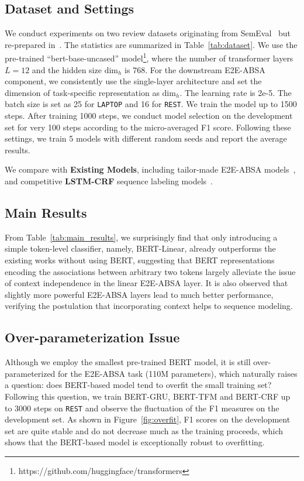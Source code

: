 \documentclass[11pt,a4paper]{article}
\begin{document}
\subsection{Dataset and Settings}
We conduct experiments on two review datasets originating from SemEval~\cite{pontiki-etal-2014-semeval,pontiki-etal-2015-semeval,pontiki-etal-2016-semeval} but re-prepared in~\citet{li2019unified}. The statistics are summarized in Table~\ref{tab:dataset}. 
We use the pre-trained ``bert-base-uncased'' model\footnote{https://github.com/huggingface/transformers}, where the number of transformer layers $L=12$ and the hidden size $\mathrm{dim}_h$ is 768. For the downstream E2E-ABSA component, we consistently use the single-layer architecture and set the dimension of task-specific representation as $\mathrm{dim}_h$. The learning rate is 2e-5. The batch size is set as 25 for \texttt{LAPTOP} and 16 for \texttt{REST}. We train the model up to 1500 steps. After training 1000 steps, we conduct model selection on the development set for very 100 steps according to the micro-averaged F1 score. Following these settings, we train 5 models with different random seeds and report the average results.



We compare with \textbf{Existing Models}, including tailor-made E2E-ABSA models~\cite{li2019unified,luo-etal-2019-doer,he-etal-2019-interactive}, and competitive \textbf{LSTM-CRF} sequence labeling models~\cite{lample-etal-2016-neural,ma-hovy-2016-end,liu2018empower}.

\subsection{Main Results}
From Table~\ref{tab:main_results}, we surprisingly find that only introducing a simple token-level classifier, namely, BERT-Linear, already outperforms the existing works without using BERT, suggesting that BERT representations encoding the associations between arbitrary two tokens largely alleviate the issue of context independence in the linear E2E-ABSA layer. It is also observed that slightly more powerful E2E-ABSA layers lead to much better performance, verifying the postulation that incorporating context helps to sequence modeling.

\subsection{Over-parameterization Issue}
Although we employ the smallest pre-trained BERT model, it is still over-parameterized for the E2E-ABSA task (110M parameters), which naturally raises a question: does BERT-based model tend to overfit the small training set? Following this question, we train BERT-GRU, BERT-TFM and BERT-CRF up to 3000 steps on \texttt{REST} and observe the fluctuation of the F1 measures on the development set. As shown in Figure~\ref{fig:overfit}, F1 scores on the development set are quite stable and do not decrease much as the training proceeds, which shows that the BERT-based model is exceptionally robust to overfitting. 
\end{document}
